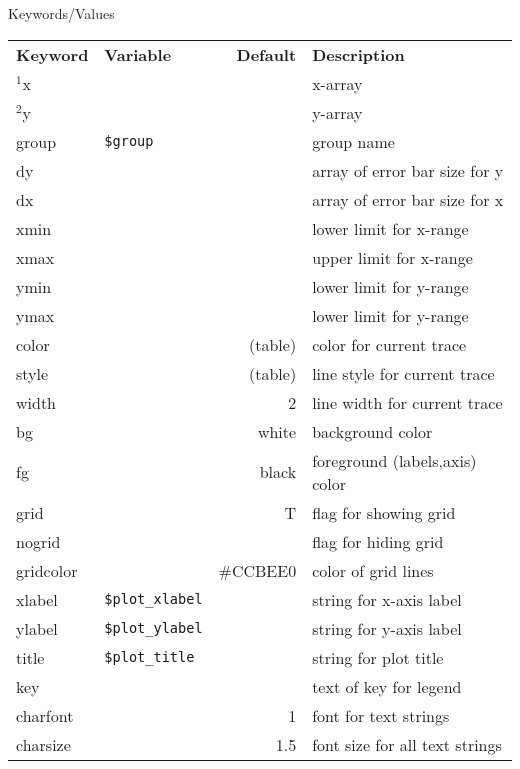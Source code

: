 \begin{IFFcom}
\item[Keywords/Values]
  {\relax \hspace{1.1truein}\par\noindent\relax}
  \begin{tabular}{llrl}
    \textbf{Keyword} & \textbf{Variable} & \textbf{Default} &
    \textbf{Description}\\
    \noalign{\smallskip}
    ${}^{1}${x} &     & & {x-array} \\ 
    ${}^{2}${y} &     & & {y-array} \\ 
    {group}     & {\tt{\$group}} & & {group name} \\ 
    {dy}        &    & & {array of error bar size for y}\\
    {dx}        &    & & {array of error bar size for x}\\
    {xmin}      &    & & {lower limit for x-range} \\ 
    {xmax}      &    & & {upper limit for x-range} \\ 
    {ymin}      &    & & {lower limit for y-range} \\ 
    {ymax}      &    & & {lower limit for y-range} \\ 
    \noalign{\smallskip}
    {color}     &   & (table) & {color for current trace}\\
    {style}     &   & (table) & {line style  for current trace}\\
    {width}     &   & 2 & {line width for current trace}\\
    {bg}        &   &white & {background color} \\ 
    {fg}        &   &black & {foreground (labels,axis) color} \\ 
    {grid}      &   &T & {flag for showing grid} \\ 
    {nogrid}    &   &  & {flag for hiding grid} \\ 
    {gridcolor} &   &\#CCBEE0 & {color of grid lines} \\ 
    \noalign{\smallskip}
    {xlabel}    & {\tt{\$plot\_xlabel}} & & {string for x-axis label}\\
    {ylabel}    & {\tt{\$plot\_ylabel}} & & {string for y-axis label}\\
    {title}     & {\tt{\$plot\_title}} & & {string for plot title}\\
    {key}       &   & & {text of key for legend} \\ 
    {charfont}  &   &1 & {font for text strings}\\
    {charsize}  &   &1.5 &  {font size for all text strings}\\

\end{tabular}
\end{IFFcom}
